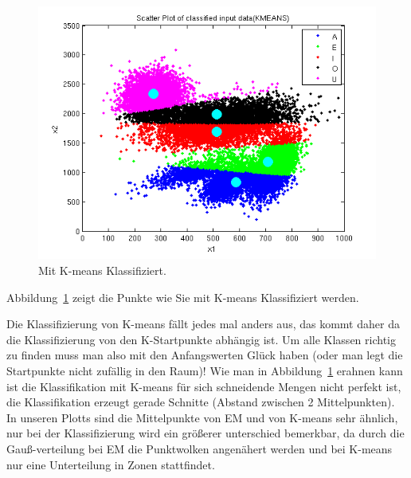 \begin{figure}[h!]
  \begin{center}
    \includegraphics[width=1\textwidth]{./figures/6_2_classified}
    \caption{Mit K-means Klassifiziert.}
    \label{fig:6_2_classified}
  \end{center}
\end{figure}

Abbildung~\ref{fig:6_2_classified} zeigt die Punkte wie Sie mit K-means Klassifiziert werden.\newline
 


Die Klassifizierung von K-means fällt jedes mal anders aus, das kommt daher da die Klassifizierung von den K-Startpunkte abhängig ist. Um alle Klassen richtig zu finden muss man also mit den Anfangswerten Glück haben (oder man legt die Startpunkte nicht zufällig in den Raum)! Wie man in Abbildung~\ref{fig:6_2_classified} erahnen kann ist die Klassifikation mit K-means für sich schneidende Mengen nicht perfekt ist, die Klassifikation erzeugt gerade Schnitte (Abstand zwischen 2 Mittelpunkten).
In unseren Plotts sind die Mittelpunkte von  EM und von K-means sehr ähnlich, nur bei der Klassifizierung wird ein größerer unterschied bemerkbar, da durch die Gauß-verteilung bei EM die Punktwolken angenähert werden und bei K-means nur eine Unterteilung in Zonen stattfindet.